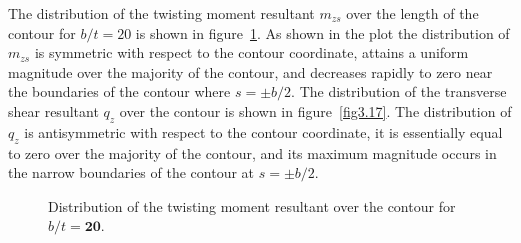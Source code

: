 \documentclass{AeroStructure-ERJohnson}
\begin{document}
The distribution of the twisting moment resultant $m_{z s}$ over the length of the contour for $b/t = 20$ is shown in figure~\ref{fig3.16}. As shown in the plot the distribution of $m_{z s}$ is symmetric with respect to the contour coordinate, attains a uniform magnitude over the majority of the contour, and decreases rapidly to zero near the boundaries of the contour where $s=\pm b / 2$. The distribution of the transverse shear resultant $q_{z}$ over the contour is shown in figure~\ref{fig3.17}. The distribution of $q_{z}$ is antisymmetric with respect to the contour coordinate, it is essentially equal to zero over the majority of the contour, and its maximum magnitude occurs in the narrow boundaries of the contour at $s=\pm b / 2$.

{\def\thefigure{3.16}
\begin{figure}[!b]
\caption{Distribution of the twisting moment resultant over the contour for $b/t = \textbf{20}$.}\label{fig3.16}
\end{figure}}

{\def\thefigure{3.17}
}
\end{document}
